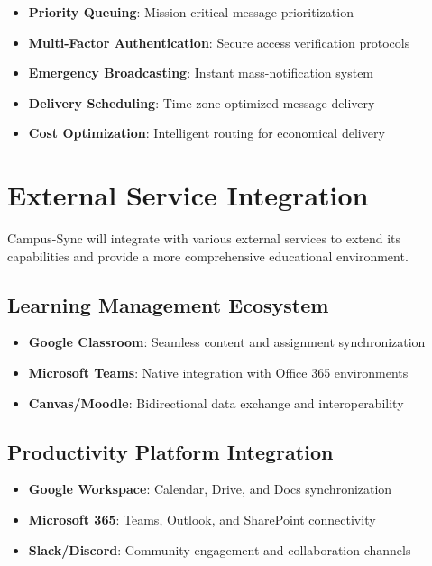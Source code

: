 \begin{itemize}
    \item \textbf{Priority Queuing}: Mission-critical message prioritization
    \item \textbf{Multi-Factor Authentication}: Secure access verification protocols
    \item \textbf{Emergency Broadcasting}: Instant mass-notification system
    \item \textbf{Delivery Scheduling}: Time-zone optimized message delivery
    \item \textbf{Cost Optimization}: Intelligent routing for economical delivery
\end{itemize}

\section{External Service Integration}

Campus-Sync will integrate with various external services to extend its capabilities and provide a more comprehensive educational environment.

\subsection{Learning Management Ecosystem}

\begin{itemize}
    \item \textbf{Google Classroom}: Seamless content and assignment synchronization
    \item \textbf{Microsoft Teams}: Native integration with Office 365 environments
    \item \textbf{Canvas/Moodle}: Bidirectional data exchange and interoperability
\end{itemize}

\subsection{Productivity Platform Integration}

\begin{itemize}
    \item \textbf{Google Workspace}: Calendar, Drive, and Docs synchronization
    \item \textbf{Microsoft 365}: Teams, Outlook, and SharePoint connectivity
    \item \textbf{Slack/Discord}: Community engagement and collaboration channels
\end{itemize}

